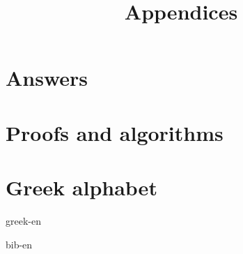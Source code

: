 \documentclass[b5paper]{article}
\begin{document}
\title{Appendices}

\maketitle
\fi


\chapter{Answers}
\label{ch:answers}
\shipoutAnswer

\chapter{Proofs and algorithms}


\chapter{Greek alphabet} \label{ch:greek-letters}
{greek-en}

\markboth{\bibname}{}

\begin{thebibliography}{99}
  {bib-en}
\end{thebibliography}

\ifx\wholebook\relax \else
\expandafter\enddocument
\fi
\end{document}
